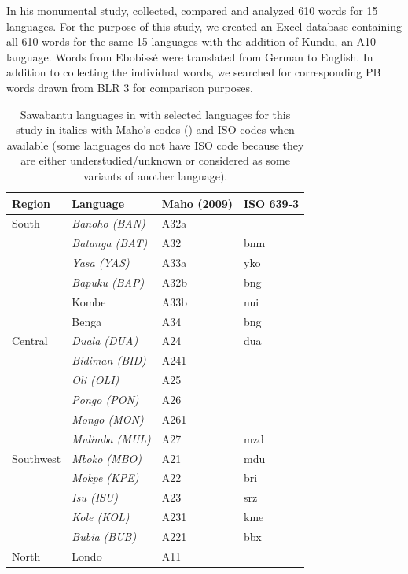\documentclass[output=paper,colorlinks,citecolor=brown
]{langscibook}
\begin{document}
In his monumental study, \citet{ebobisse2015} collected, compared and analyzed 610 words for 15 languages. For the purpose of this study, we created an Excel database containing all 610 words for the same 15 languages with the addition of Kundu, an A10 language. Words from Ebobissé were translated from German to English. In addition to collecting the individual words, we searched for corresponding PB words drawn from BLR 3 \citep{bastinetal2002} for comparison purposes.

\begin{table}
\caption{Sawabantu languages in \citet{ebobisse2015} with selected languages for this study in italics with Maho’s codes (\citeyear{maho2009}) and ISO codes when available (some languages do not have ISO code because they are either understudied/unknown or considered as some variants of another language).}
\label{tab:grollemundbrownrule:languages}
 \begin{tabular}{llll}
  \lsptoprule
          Region  & Language & Maho (2009) & ISO 639-3\\
  \midrule
  South  &   \textit{Banoho (BAN)} & A32a &   \\
    &   \textit{Batanga (BAT)} & A32 &  bnm  \\
    &  \textit{Yasa (YAS)} & A33a &  yko  \\
    &   \textit{Bapuku (BAP)} & A32b &  bng  \\
    &   Kombe & A33b &  nui  \\
    &   Benga & A34 &  bng  \\
  Central  &   \textit{Duala (DUA)} & A24 & dua  \\
    &   \textit{Bidiman (BID)} & A241 &   \\
    &   \textit{Oli (OLI)} & A25 &   \\
    &  \textit{ Pongo (PON)} & A26 &   \\
    &   \textit{Mongo (MON)} & A261 &   \\
    &   \textit{Mulimba (MUL)} & A27 & mzd  \\
Southwest  &   \textit{Mboko (MBO)} & A21 & mdu  \\
    &   \textit{Mokpe (KPE)} & A22 & bri  \\
    &  \textit{Isu (ISU)} & A23 & srz  \\
    &   \textit{Kole (KOL)} & A231 & kme \\
    &   \textit{Bubia (BUB)} & A221 & bbx  \\
North  &   Londo  & A11 &  \\

\end{tabular}
\end{table}
\end{document}
